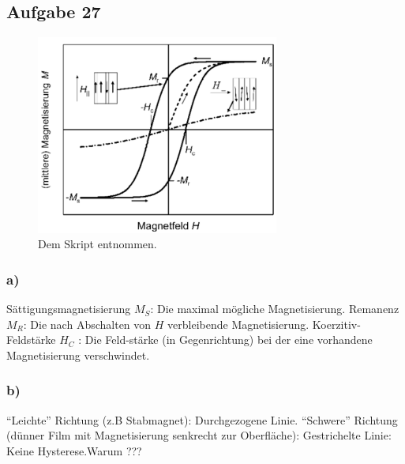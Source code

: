 \newpage
\subsection*{Aufgabe 27}
\begin{figure}
  \centering
  \includegraphics[width=8cm]{aufgabe27.png}
\caption{Dem Skript entnommen.}
\end{figure}
\subsubsection*{a)}
Sättigungsmagnetisierung $M_S$: Die maximal mögliche Magnetisierung.
Remanenz $M_R$: Die nach Abschalten von $H$ verbleibende Magnetisierung.
Koerzitiv-Feldstärke $H_C$ : Die Feld-stärke (in Gegenrichtung) bei der eine
vorhandene Magnetisierung verschwindet.

\subsubsection*{b)}
"`Leichte"' Richtung (z.B Stabmagnet): Durchgezogene Linie. "`Schwere"' Richtung
(dünner Film mit Magnetisierung senkrecht zur Oberfläche): Gestrichelte Linie:
Keine Hysterese.\newline Warum ???

